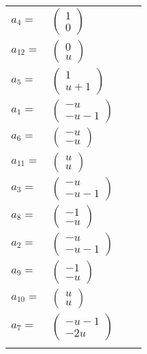 \documentclass[1p]{elsarticle_modified}
\theoremstyle{definition}
\begin{document}
\begin{tabular}{m{7pt} m{180pt} m{7pt} m{180pt} }
\flushright $a_{4}=$&$\begin{pmatrix}1\\0\end{pmatrix}$ \\
\flushright $a_{12}=$&$\begin{pmatrix}0\\u\end{pmatrix}$ \\
\flushright $a_{5}=$&$\begin{pmatrix}1\\u+1\end{pmatrix}$ \\
\flushright $a_{1}=$&$\begin{pmatrix}- u\\- u-1\end{pmatrix}$ \\
\flushright $a_{6}=$&$\begin{pmatrix}- u\\- u\end{pmatrix}$ \\
\flushright $a_{11}=$&$\begin{pmatrix}u\\u\end{pmatrix}$ \\
\flushright $a_{3}=$&$\begin{pmatrix}- u\\- u-1\end{pmatrix}$ \\
\flushright $a_{8}=$&$\begin{pmatrix}-1\\- u\end{pmatrix}$ \\
\flushright $a_{2}=$&$\begin{pmatrix}- u\\- u-1\end{pmatrix}$ \\
\flushright $a_{9}=$&$\begin{pmatrix}-1\\- u\end{pmatrix}$ \\
\flushright $a_{10}=$&$\begin{pmatrix}u\\u\end{pmatrix}$ \\
\flushright $a_{7}=$&$\begin{pmatrix}- u-1\\-2 u\end{pmatrix}$\\&\end{tabular}
\end{document}
